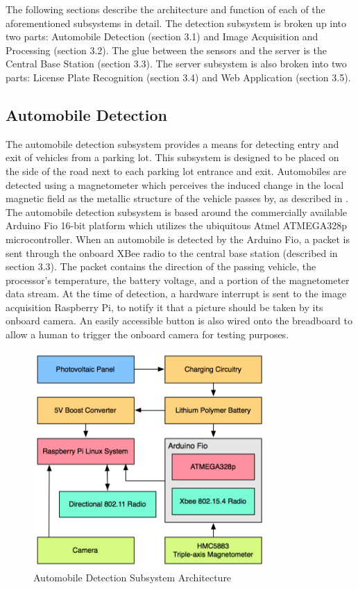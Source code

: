 \documentclass[11pt, oneside, fullpage, doublespace]{article}
\begin{document}
The following sections describe the architecture and function of each of the aforementioned subsystems in detail. The detection subsystem is broken up into two parts: Automobile Detection (section 3.1) and Image Acquisition and Processing (section 3.2). The glue between the sensors and the server is the Central Base Station (section 3.3). The server subsystem is also broken into two parts: License Plate Recognition (section 3.4) and Web Application (section 3.5).

\subsection{Automobile Detection}
The automobile detection subsystem provides a means for detecting entry and exit of vehicles from a parking lot. This subsystem is designed to be placed on the side of the road next to each parking lot entrance and exit. Automobiles are detected using a magnetometer which perceives the induced change in the local magnetic field as the metallic structure of the vehicle passes by, as described in \cite{stillwell2013}. The automobile detection subsystem is based around the commercially available Arduino Fio 16-bit platform which utilizes the ubiquitous Atmel ATMEGA328p microcontroller. When an automobile is detected by the Arduino Fio, a packet is sent through the onboard XBee radio to the central base station (described in section 3.3). The packet  contains the direction of the passing vehicle, the processor's temperature, the battery voltage, and a portion of the magnetometer data stream. At the time of detection, a hardware interrupt is sent to the image acquisition Raspberry Pi, to notify it that a picture should be taken by its onboard camera. An easily accessible button is also wired onto the breadboard to allow a human to trigger the onboard camera for testing purposes.

\begin{figure}
\begin{center}
\includegraphics[width=3.5in]{autodetection}
\end{center}
\caption{Automobile Detection Subsystem Architecture}
\label{fig:autodetect}
\end{figure}
\end{document}
